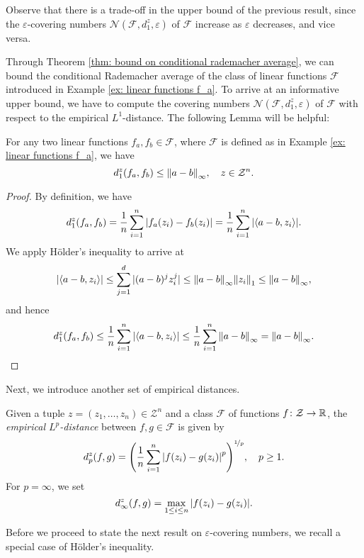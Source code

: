 Observe that there is a trade-off in the upper bound of the previous result, since the $\varepsilon$-covering numbers $\mathcal{N}(\mathcal{F}, d_1^z, \varepsilon)$ of $\mathcal{F}$ increase as $\varepsilon$ decreases, and vice versa. 

Through Theorem \ref{thm: bound on conditional rademacher average}, we can bound the conditional Rademacher average of the class of linear functions $\mathcal{F}$ introduced in Example \ref{ex: linear functions f_a}. To arrive at an informative upper bound, we have to compute the covering numbers $\mathcal{N}(\mathcal{F}, d_1^z, \varepsilon)$ of $\mathcal{F}$ with respect to the empirical $L^1$-distance. The following Lemma will be helpful:

\begin{lemma}
For any two linear functions $f_a, f_b \in \mathcal{F}$, where $\mathcal{F}$ is defined as in Example \ref{ex: linear functions f_a}, we have
\[
    d_1^z(f_a, f_b) \leq \norm{a - b}_{\infty}, \quad z \in \mathcal{Z}^n.
\]
\end{lemma}

\begin{proof}
By definition, we have
\[
    d_1^z(f_a, f_b) = \frac{1}{n} \sum_{i=1}^n \abs{f_a(z_i) - f_b(z_i)} = \frac{1}{n} \sum_{i=1}^n \abs{\langle a - b, z_i \rangle}.
\]
We apply H{\"o}lder's inequality to arrive at
\[
    \abs{\langle a - b, z_i \rangle} \leq \sum_{j=1}^d \abs*{(a - b)^j z_i^j} \leq \norm{a - b}_{\infty} \norm{z_i}_1 \leq \norm{a - b}_{\infty},
\]
and hence
\[
    d_1^z(f_a, f_b) \leq \frac{1}{n} \sum_{i=1}^n \abs{\langle a - b, z_i \rangle} \leq \frac{1}{n} \sum_{i=1}^n \norm{a - b}_{\infty} = \norm{a - b}_{\infty}. \qedhere
\]
\end{proof}

Next, we introduce another set of empirical distances.

\begin{definition}
Given a tuple $z = (z_1, \dots, z_n) \in \mathcal{Z}^n$ and a class $\mathcal{F}$ of functions $f \colon \mathcal{Z} \to \mathbb{R}$, the \emph{empirical $L^p$-distance} between $f, g \in \mathcal{F}$ is given by
\[
    d_p^z(f, g) = \left(\frac{1}{n} \sum_{i=1}^n \abs{f(z_i) - g(z_i)}^p \right)^{\nicefrac{1}{p}}, \quad p \geq 1.
\]
For $p = \infty$, we set
\[
    d_{\infty}^z(f, g) = \max_{1 \leq i \leq n} \abs{f(z_i) - g(z_i)}.
\]
\end{definition}

Before we proceed to state the next result on $\varepsilon$-covering numbers, we recall a special case of H{\"o}lder's inequality.


